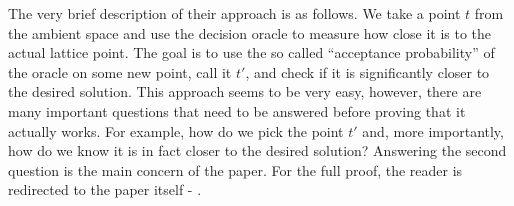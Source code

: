 The very brief description of their approach is as follows. We take a point $t$ from the ambient space and use the decision oracle to measure how close it is to the actual lattice point. The goal is to use the so called ``acceptance probability'' of the oracle on some new point, call it $t'$, and check if it is significantly closer to the desired solution. This approach seems to be very easy, however, there are many important questions that need to be answered before proving that it actually works. For example, how do we pick the point $t'$ and, more importantly, how do we know it is in fact closer to the desired solution? Answering the second question is the main concern of the paper. For the full proof, the reader is redirected to the paper itself - \cite{oracle}.
